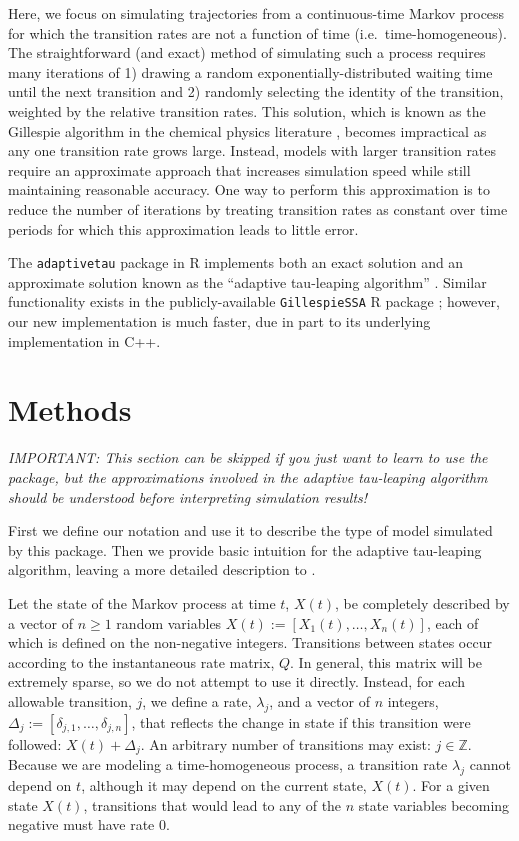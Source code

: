 \documentclass[11pt,nogin]{article}
\begin{document}
Here, we focus on simulating trajectories from a continuous-time Markov process for which the transition rates are not a function of time (i.e.\ time-homogeneous).  The straightforward (and exact) method of simulating such a process requires many iterations of 1) drawing a random ex\-po\-nen\-tial\-ly-dis\-tri\-buted waiting time until the next transition and 2) randomly selecting the identity of the transition, weighted by the relative transition rates.  This solution, which is known as the Gillespie algorithm in the chemical physics literature \citep{Gil76}, becomes impractical as any one transition rate grows large.  Instead, models
with larger transition rates require an approximate approach that increases simulation speed while still maintaining reasonable accuracy.  One way to perform this approximation is to reduce the number of iterations by treating transition rates as constant over time periods for which this approximation leads to little error.

The \texttt{adaptivetau} package in R implements both an exact solution and an approximate solution known as the ``adaptive tau-leaping algorithm'' \citep{CGP07}.  Similar functionality exists in the publicly-available \texttt{GillespieSSA} R package \citep{Pin08}; however, our new implementation is much faster, due in part to its underlying implementation in C++.


\section*{Methods}

\emph{IMPORTANT: This section can be skipped if you just want to learn to use the package, but the approximations involved in the adaptive tau-leaping algorithm should be understood before interpreting simulation results!}

First we define our notation and use it to describe the type of model simulated by this package. Then we provide basic intuition for the adaptive tau-leaping algorithm, leaving a more detailed description to \citet{CGP07}.

Let the state of the Markov process at time $t$, $X(t)$, be completely described by a vector of $n\ge1$ random variables $X(t):=[X_{1}(t),\ldots,X_{n}(t)]$, each of which is defined on the non-negative integers. Transitions between states occur according to the instantaneous rate matrix, $Q$. In general, this matrix will be extremely sparse, so we do not attempt to use it directly. Instead, for each allowable transition, $j$, we define a rate, $\lambda_{j}$, and a vector of $n$ integers, $\Delta_{j}:=[\delta_{j,1},\ldots,\delta_{j,n}]$, that reflects the change in state if this transition were followed: $X(t)+\Delta_{j}$. An arbitrary number of transitions may exist: $j\in\mathbb{Z}$. Because we are modeling a time-homogeneous process, a transition rate $\lambda_{j}$ cannot depend on $t$, although it may depend on the current state, $X(t)$. For a given state $X(t)$, transitions that would lead to any of the $n$ state variables becoming negative must have rate 0.
\end{document}
